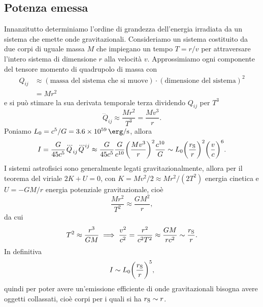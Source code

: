 \subsection{Potenza emessa}
\label{sec:potenza-emessa}

Innanzitutto determiniamo l'ordine di grandezza dell'energia irradiata da un
sistema che emette onde gravitazionali.  Consideriamo un sistema costituito da
due corpi di uguale massa $M$ che impiegano un tempo $T = r/v$ per attraversare
l'intero sistema di dimensione $r$ alla velocità $v$.  Approssimiamo ogni
componente del tensore momento di quadrupolo di massa con
\begin{equation}
  \begin{split}
    Q_{ij} &\approx (\text{massa del sistema che si muove}) \cdot
    (\text{dimensione del sistema})^{2} \\
    &= M r^{2}
  \end{split}
\end{equation}
e si può stimare la sua derivata temporale terza dividendo $Q_{ij}$ per $T^{3}$
\begin{equation}
  \dddot{Q}_{ij} \approx \frac{Mr^{2}}{T^{3}} = \frac{Mv^{3}}{r}.
\end{equation}
Poniamo $L_{0} = c^{5}/G = \SI{3.6e59}{\erg\per\second}$, allora
\begin{equation}
  I = \frac{G}{45c^{5}} \dddot{Q}_{ij} \dddot{Q}^{ij} \approx \frac{G}{45c^{5}}
  \frac{G}{c^{10}} \bigg(\frac{M v^{3}}{r}\bigg)^{2} \frac{c^{10}}{G} \sim
  L_{0} \bigg(\frac{r_{\textup{S}}}{r}\bigg)^{2} \bigg(\frac{v}{c}\bigg)^{6}.
\end{equation}
I sistemi astrofisici sono generalmente legati gravitazionalmente, allora per il
teorema del viriale $2K + U = 0$, con $K = Mv^{2}/2 \approx M r^{2}/(2T^{2})$
energia cinetica e $U = -GM/r$ energia potenziale gravitazionale, cioè
\begin{equation}
  \frac{Mr^{2}}{T^{2}} \approx \frac{GM^{2}}{r},
\end{equation}
da cui
\begin{equation}
  T^{2} \approx \frac{r^{3}}{GM} \implies \frac{v^{2}}{c^{2}} =
  \frac{r^{2}}{c^{2}T^{2}} \approx \frac{GM}{rc^{2}} \sim
  \frac{r_{\textup{S}}}{r}.
\end{equation}
In definitiva
\begin{equation}
  I \sim L_{0} \bigg(\frac{r_{\textup{S}}}{r}\bigg)^{5},
\end{equation}
quindi per poter avere un'emissione efficiente di onde gravitazionali bisogna
avere oggetti collassati, cioè corpi per i quali si ha $r_{\textup{S}} \sim r$.

